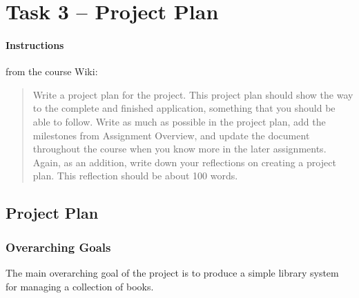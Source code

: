 %
%
%
%


\section{Task 3 -- Project Plan}\label{task-3}

\paragraph{Instructions}\label{task-3-instructions}
from the course Wiki\cite{1dv600:lab1:instructions}:

\begin{quote}
  Write a project plan for the project. This project plan should show the way
  to the complete and finished application, something that you should be able
  to follow. Write as much as possible in the project plan, add the
  milestones from Assignment Overview, and update the document throughout the
  course when you know more in the later assignments.  Again, as an addition,
  write down your reflections on creating a project plan. This reflection
  should be about 100 words.
\end{quote}


\subsection{Project Plan}\label{task-3-project-plan}

\subsubsection{Overarching Goals}\label{task-3-goals}
The main overarching goal of the project is to produce a simple library system
for managing a collection of books.

